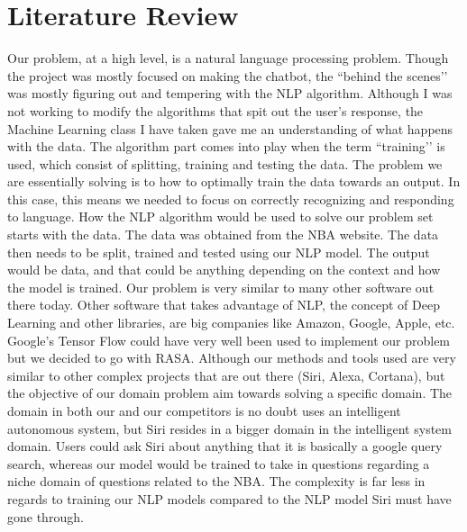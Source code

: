 \documentclass[conference]{IEEEtran}
\begin{document}
\section*{Literature Review}
Our problem, at a high level, is a natural language processing problem. Though the project was mostly focused on making the chatbot, the ``behind the scenes’’ was mostly figuring out and tempering with the NLP algorithm. Although I was not working to modify the algorithms that spit out the user’s response, the Machine Learning class I have taken gave me an understanding of what happens with the data. The algorithm part comes into play when the term ``training’’ is used, which consist of splitting, training and testing the data. The problem we are essentially solving is to how to optimally train the data towards an output. In this case, this means we needed to focus on correctly recognizing and responding to language. How the NLP algorithm would be used to solve our problem set starts with the data. The data was obtained from the NBA website. The data then needs to be split, trained and tested using our NLP model. The output would be data, and that could be anything depending on the context and how the model is trained. Our problem is very similar to many other software out there today. Other software that takes advantage of NLP, the concept of Deep Learning and other libraries, are big companies like Amazon, Google, Apple, etc. Google’s Tensor Flow could have very well been used to implement our problem but we decided to go with RASA. Although our methods and tools used are very similar to other complex projects that are out there (Siri, Alexa, Cortana), but the objective of our domain problem aim towards solving a specific domain. The domain in both our and our competitors is no doubt uses an intelligent autonomous system, but Siri resides in a bigger domain in the intelligent system domain. Users could ask Siri about anything that it is basically a google query search, whereas our model would be trained to take in questions regarding a niche domain of questions related to the NBA. The complexity is far less in regards to training our NLP models compared to the NLP model Siri must have gone through. 
\end{document}
